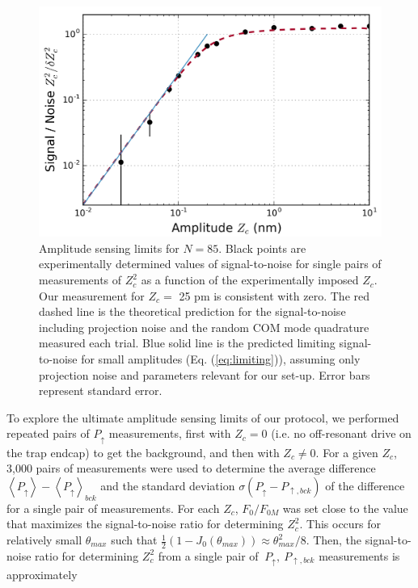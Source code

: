 \documentclass[aps,prl,twocolumn,superscriptaddress,floatfix]{revtex4-1}
\begin{document}
\begin{figure}
\includegraphics[width=\columnwidth]{sensing_limit}
\caption{Amplitude sensing limits for $N=85$. Black points are experimentally determined values of signal-to-noise for single pairs of measurements of $Z_{c}^{2}$ as a function of the experimentally imposed $Z_c$. Our measurement for $Z_c =$ 25 pm is consistent with zero. The red dashed line is the theoretical prediction for the signal-to-noise including projection noise and the random COM mode quadrature measured each trial. Blue solid line is the predicted limiting signal-to-noise for small amplitudes (Eq. (\ref{eq:limiting})), assuming only projection noise and parameters relevant for our set-up. Error bars represent standard error.} \label{Fig_sens}
\end{figure}

To explore the ultimate amplitude sensing limits of our protocol, we performed repeated pairs of $P_{\uparrow}$ measurements,
first with $Z_c = 0$ (i.e. no off-resonant drive on the trap endcap)
to get the background, and then with \mbox{$Z_{c}\neq0$}. For a given $Z_{c}$,
3,000 pairs of measurements were used to determine the average difference $\left\langle P_{\uparrow}\right\rangle -\left\langle P_{\uparrow}\right\rangle _{bck}$
and the standard deviation $\sigma\left( P_{\uparrow} - P_{\uparrow ,bck} \right)$
of the difference for a single pair of measurements. For each $Z_c$, $F_{0}/F_{0M}$ was set close to the value that maximizes the signal-to-noise ratio for determining $Z_{c}^{2}$. This occurs for relatively small
$\theta_{max}$ such that \mbox{$\frac{1}{2}\left(1-J_{0}\left(\theta_{max}\right)\right)\approx\theta_{max}^{2}/8$}. Then, the signal-to-noise ratio for determining $Z_{c}^{2}$ from a single pair of $\ P_{\uparrow},\: P_{\uparrow, bck}$ measurements is approximately 
\end{document}

